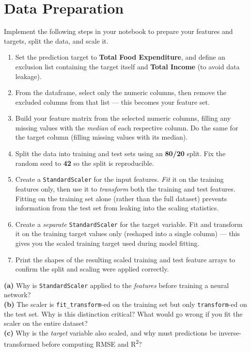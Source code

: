 \documentclass[12pt,a4paper]{article}
\begin{document}
\section{Data Preparation}

Implement the following steps in your notebook to prepare your features and targets,
split the data, and scale it.

\begin{stepbox}
\begin{enumerate}[leftmargin=*, label=\arabic*.]
  \item Set the prediction target to \textbf{Total Food Expenditure}, and define an
        exclusion list containing the target itself and \textbf{Total Income}
        (to avoid data leakage).
  \item From the dataframe, select only the numeric columns, then remove the
        excluded columns from that list — this becomes your feature set.
  \item Build your feature matrix from the selected numeric columns, filling any
        missing values with the \emph{median} of each respective column. Do the
        same for the target column (filling missing values with its median).
  \item Split the data into training and test sets using an \textbf{80/20} split.
        Fix the random seed to \textbf{42} so the split is reproducible.
  \item Create a \texttt{StandardScaler} for the input features. \emph{Fit} it on the
        training features only, then use it to \emph{transform} both the training
        and test features. Fitting on the training set alone (rather than the full
        dataset) prevents information from the test set from leaking into the
        scaling statistics.
  \item Create a \emph{separate} \texttt{StandardScaler} for the target variable.
        Fit and transform it on the training target values only (reshaped into a
        single column) — this gives you the scaled training target used during
        model fitting.
  \item Print the shapes of the resulting scaled training and test feature arrays
        to confirm the split and scaling were applied correctly.
\end{enumerate}
\end{stepbox}

\begin{tcolorbox}[colback=lightblue!40, colframe=myColorB, title={\textbf{2.1 — Questions}}, fonttitle=\small\bfseries, breakable]
\textbf{(a)} Why is \texttt{StandardScaler} applied to the \emph{features} before training a neural network?\\[6pt]
\textbf{(b)} The scaler is \texttt{fit\_transform}-ed on the training set but only \texttt{transform}-ed on the test set.
Why is this distinction critical? What would go wrong if you fit the scaler on the entire dataset?\\[6pt]
\textbf{(c)} Why is the \emph{target} variable also scaled, and why must predictions be inverse-transformed before computing RMSE and R\textsuperscript{2}?
\end{tcolorbox}
\end{document}
